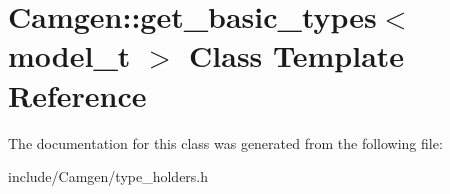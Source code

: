 \hypertarget{a00243}{}\section{Camgen\+:\+:get\+\_\+basic\+\_\+types$<$ model\+\_\+t $>$ Class Template Reference}
\label{a00243}


The documentation for this class was generated from the following file\+:\begin{DoxyCompactItemize}
\item 
include/\+Camgen/type\+\_\+holders.\+h\end{DoxyCompactItemize}
